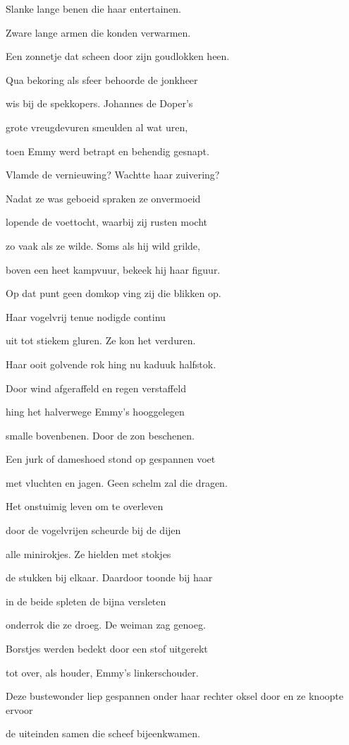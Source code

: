 Slanke lange benen
die haar entertainen.

Zware lange armen
die konden verwarmen.

Een zonnetje dat scheen
door zijn goudlokken heen.

Qua bekoring als sfeer
behoorde de jonkheer

wis bij de spekkopers.
Johannes de Doper’s

grote vreugdevuren
smeulden al wat uren,

toen Emmy werd betrapt
en behendig gesnapt.

Vlamde de vernieuwing?
Wachtte haar zuivering?

Nadat ze was geboeid
spraken ze onvermoeid

lopende de voettocht,
waarbij zij rusten mocht

zo vaak als ze wilde.
Soms als hij wild grilde,

boven een heet kampvuur,
bekeek hij haar figuur.

Op dat punt geen domkop
ving zij die blikken op.

Haar vogelvrij tenue
nodigde continu

uit tot stiekem gluren.
Ze kon het verduren.

Haar ooit golvende rok
hing nu kaduuk halfstok.

Door wind afgeraffeld
en regen verstaffeld

hing het halverwege
Emmy’s hooggelegen

smalle bovenbenen.
Door de zon beschenen.

Een jurk of dameshoed
stond op gespannen voet

met vluchten en jagen.
Geen schelm zal die dragen.

Het onstuimig leven
om te overleven

door de vogelvrijen
scheurde bij de dijen

alle minirokjes.
Ze hielden met stokjes

de stukken bij elkaar.
Daardoor toonde bij haar

in de beide spleten
de bijna versleten

onderrok die ze droeg.
De weiman zag genoeg.

Borstjes werden bedekt
door een stof uitgerekt

tot over, als houder,
Emmy’s linkerschouder.

Deze bustewonder
liep gespannen onder
haar rechter oksel door
en ze knoopte ervoor

de uiteinden samen
die scheef bijeenkwamen.

